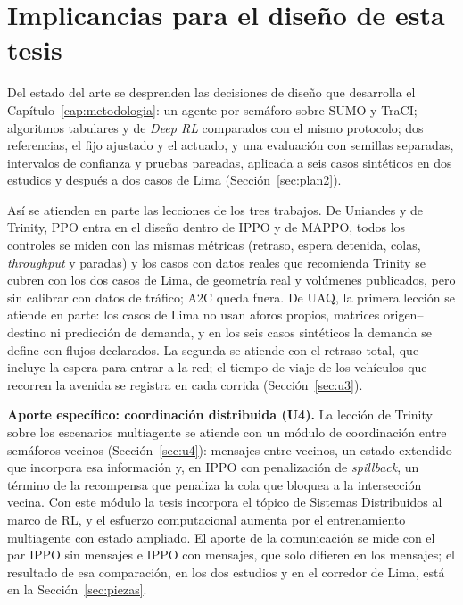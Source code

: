\section{Implicancias para el diseño de esta tesis}
\label{sec:implicancias}

Del estado del arte se desprenden las decisiones de diseño que desarrolla el Capítulo~\ref{cap:metodologia}: un agente por semáforo sobre SUMO y TraCI; algoritmos tabulares y de \textit{Deep RL} comparados con el mismo protocolo; dos referencias, el fijo ajustado y el actuado, y una evaluación con semillas separadas, intervalos de confianza y pruebas pareadas, aplicada a seis casos sintéticos en dos estudios y después a dos casos de Lima (Sección~\ref{sec:plan2}).

Así se atienden en parte las lecciones de los tres trabajos. De Uniandes y de Trinity, PPO entra en el diseño dentro de IPPO y de MAPPO, todos los controles se miden con las mismas métricas (retraso, espera detenida, colas, \textit{throughput} y paradas) y los casos con datos reales que recomienda Trinity se cubren con los dos casos de Lima, de geometría real y volúmenes publicados, pero sin calibrar con datos de tráfico; A2C queda fuera. De UAQ, la primera lección se atiende en parte: los casos de Lima no usan aforos propios, matrices origen--destino ni predicción de demanda, y en los seis casos sintéticos la demanda se define con flujos declarados. La segunda se atiende con el retraso total, que incluye la espera para entrar a la red; el tiempo de viaje de los vehículos que recorren la avenida se registra en cada corrida (Sección~\ref{sec:u3}).

\noindent\textbf{Aporte específico: coordinación distribuida (U4).} La lección de Trinity sobre los escenarios multiagente se atiende con un módulo de coordinación entre semáforos vecinos (Sección~\ref{sec:u4}): mensajes entre vecinos, un estado extendido que incorpora esa información y, en IPPO con penalización de \textit{spillback}, un término de la recompensa que penaliza la cola que bloquea a la intersección vecina. Con este módulo la tesis incorpora el tópico de Sistemas Distribuidos al marco de RL, y el esfuerzo computacional aumenta por el entrenamiento multiagente con estado ampliado. El aporte de la comunicación se mide con el par IPPO sin mensajes e IPPO con mensajes, que solo difieren en los mensajes; el resultado de esa comparación, en los dos estudios y en el corredor de Lima, está en la Sección~\ref{sec:piezas}.
